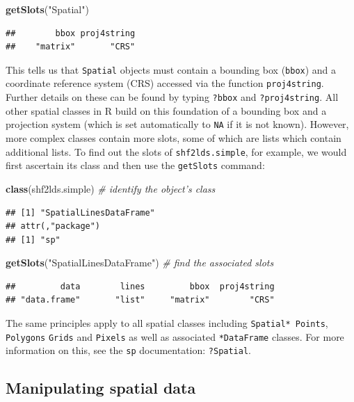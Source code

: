 \documentclass[]{article}
\newenvironment{Shaded}{}{}
\newcommand{\KeywordTok}[1]{\textcolor[rgb]{0.00,0.44,0.13}{\textbf{{#1}}}}
\newcommand{\StringTok}[1]{\textcolor[rgb]{0.25,0.44,0.63}{{#1}}}
\newcommand{\CommentTok}[1]{\textcolor[rgb]{0.38,0.63,0.69}{\textit{{#1}}}}
\newcommand{\NormalTok}[1]{{#1}}
\begin{document}
\begin{Shaded}
\begin{Highlighting}[]
\KeywordTok{getSlots}\NormalTok{(}\StringTok{"Spatial"}\NormalTok{)}
\end{Highlighting}
\end{Shaded}
\begin{verbatim}
##        bbox proj4string 
##    "matrix"       "CRS"
\end{verbatim}
This tells us that \texttt{Spatial} objects must contain a bounding box
(\texttt{bbox}) and a coordinate reference system (CRS) accessed via the
function \texttt{proj4string}. Further details on these can be found by
typing \texttt{?bbox} and \texttt{?proj4string}. All other spatial
classes in R build on this foundation of a bounding box and a projection
system (which is set automatically to \texttt{NA} if it is not known).
However, more complex classes contain more slots, some of which are
lists which contain additional lists. To find out the slots of
\texttt{shf2lds.simple}, for example, we would first ascertain its class
and then use the \texttt{getSlots} command:

\begin{Shaded}
\begin{Highlighting}[]
\KeywordTok{class}\NormalTok{(shf2lds.simple)  }\CommentTok{# identify the object's class}
\end{Highlighting}
\end{Shaded}
\begin{verbatim}
## [1] "SpatialLinesDataFrame"
## attr(,"package")
## [1] "sp"
\end{verbatim}
\begin{Shaded}
\begin{Highlighting}[]
\KeywordTok{getSlots}\NormalTok{(}\StringTok{"SpatialLinesDataFrame"}\NormalTok{)  }\CommentTok{# find the associated slots}
\end{Highlighting}
\end{Shaded}
\begin{verbatim}
##         data        lines         bbox  proj4string 
## "data.frame"       "list"     "matrix"        "CRS"
\end{verbatim}
The same principles apply to all spatial classes including
\texttt{Spatial* Points}, \texttt{Polygons} \texttt{Grids} and
\texttt{Pixels} as well as associated \texttt{*DataFrame} classes. For
more information on this, see the \texttt{sp} documentation:
\texttt{?Spatial}.

\subsection{Manipulating spatial data}
\end{document}

